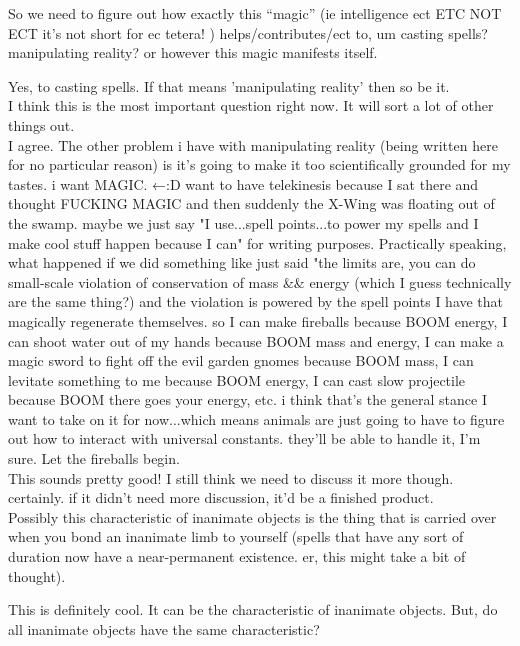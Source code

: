 \A So we need to figure out how exactly this “magic” (ie intelligence ect 
\R ETC NOT ECT it's not short for ec tetera!
\A
) helps/contributes/ect to, um casting spells? manipulating reality? 
or however this magic manifests itself. 
 

\R Yes, to casting spells. If that means 'manipulating reality' then so be it.
\\  

\A I think this is the most important question right now. It will sort a lot of
other things out. \\   

\R I agree. The other problem i have with manipulating reality (being written
here for no particular reason) is it's going to make it too scientifically
grounded for my tastes. i want MAGIC. ←:D want to have telekinesis because I sat
there and thought FUCKING MAGIC and then suddenly the X-Wing was floating out of
the swamp.  maybe we just say "I use...spell points...to power my spells and I
make cool stuff happen because I can" for writing purposes.  Practically
speaking, what happened if we did something like just said "the limits are, you
can do small-scale violation of conservation of mass \&\& energy (which I guess
technically are the same thing?) and the violation is powered by the spell
points I have that magically regenerate themselves.  so I can make fireballs
because BOOM energy, I can shoot water out of my hands because BOOM mass and
energy, I can make a magic sword to fight off the evil garden gnomes because
BOOM mass,  I can levitate something to me because BOOM energy, I can cast slow
projectile because BOOM there goes your energy, etc.  i think that's the general
stance I want to take on it for now...which means animals are just going to have
to figure out how to interact with universal constants. they'll be able to
handle it, I'm sure.  Let the fireballs begin. \\  

\A This sounds pretty good! I still think we need to discuss it more though.  
\R certainly. if it didn't need more discussion, it'd be a finished product. \\
   

\R Possibly this characteristic of inanimate objects is the thing that is
carried over when you bond an inanimate limb to yourself (spells that have any
sort of duration now have a near-permanent existence. er, this might take a bit
of thought).  

\A This is definitely cool. It can be the characteristic of inanimate objects.
But, do all inanimate objects have the same characteristic?  

